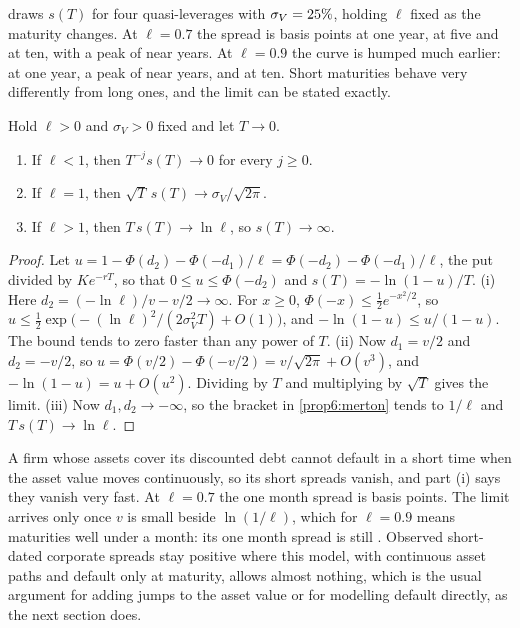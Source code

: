 \begin{chapterrefs}
 draws $s(T)$ for four quasi-leverages with $\sigma_V=25\%$, holding $\ell$
fixed as the maturity changes. At $\ell=0.7$ the spread is \mtSSevenOne{} basis points at one year,
\mtSSevenFive{} at five and \mtSSevenTen{} at ten, with a peak of \mtPeakSeven{} near
\mtPeakTSeven{} years. At $\ell=0.9$ the curve is humped much earlier: \mtSNineOne{} at one year, a
peak of \mtPeakNine{} near \mtPeakTNine{} years, and \mtSNineTen{} at ten. Short maturities
behave very differently from long ones, and the limit can be stated exactly.

\begin{proposition}\label{prop6:short}
Hold $\ell>0$ and $\sigma_V>0$ fixed and let $T\to0$.
\begin{enumerate}[label=(\roman*)]
  \item If $\ell<1$, then $T^{-j}s(T)\to0$ for every $j\ge0$.
  \item If $\ell=1$, then $\sqrt T\,s(T)\to\sigma_V/\sqrt{2\pi}$.
  \item If $\ell>1$, then $T\,s(T)\to\ln\ell$, so $s(T)\to\infty$.
\end{enumerate}
\end{proposition}

\begin{proof}
Let $u=1-\Phi(d_2)-\Phi(-d_1)/\ell=\Phi(-d_2)-\Phi(-d_1)/\ell$, the put divided by $Ke^{-rT}$, so that
$0\le u\le\Phi(-d_2)$ and $s(T)=-\ln(1-u)/T$. (i) Here $d_2=(-\ln\ell)/v-v/2\to\infty$. For $x\ge0$,
$\Phi(-x)\le\tfrac12e^{-x^2/2}$, so $u\le\tfrac12\exp\bigl(-(\ln\ell)^2/(2\sigma_V^2T)+O(1)\bigr)$, and
$-\ln(1-u)\le u/(1-u)$. The bound tends to zero faster than any power of $T$. (ii) Now $d_1=v/2$ and
$d_2=-v/2$, so $u=\Phi(v/2)-\Phi(-v/2)=v/\sqrt{2\pi}+O(v^3)$, and $-\ln(1-u)=u+O(u^2)$. Dividing by $T$
and multiplying by $\sqrt T$ gives the limit. (iii) Now $d_1,d_2\to-\infty$, so the bracket in
\cref{prop6:merton} tends to $1/\ell$ and $T\,s(T)\to\ln\ell$.
\end{proof}

A firm whose assets cover its discounted debt cannot default in a short time when the asset value
moves continuously, so its short spreads vanish, and part (i) says they vanish very fast. At
$\ell=0.7$ the one month spread is \mtSSevenQ{} basis points. The limit arrives only once $v$ is small
beside $\ln(1/\ell)$, which for $\ell=0.9$ means maturities well under a month: its one month spread
is still \mtSNineQ. Observed short-dated corporate spreads stay positive where this model, with continuous asset paths and
default only at maturity, allows almost nothing, which is the
usual argument for adding jumps to the asset value or for modelling default directly, as the next
section does.


\end{chapterrefs}
